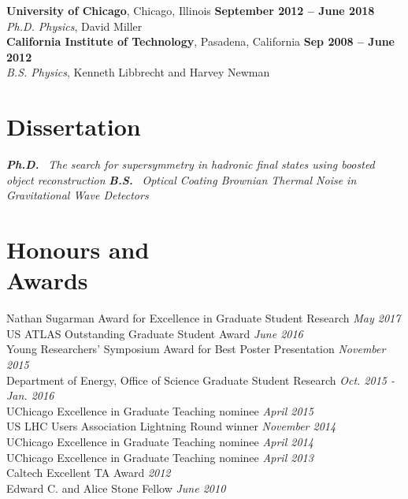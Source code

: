 \documentclass[margin,line]{resume}
\let\origsection\section%
\let\section\subsection%
\let\section\origsection%
\begin{document}
\begin{resume}
\textbf{University of Chicago}, Chicago, Illinois \hfill \textbf{September 2012 -- June 2018}\\
\textsl{Ph.D. Physics}, David Miller\\[2.5mm]
%
\textbf{California Institute of Technology}, Pasadena, California \hfill \textbf{ Sep 2008 -- June 2012}\\
\textsl{B.S. Physics}, Kenneth Libbrecht and Harvey Newman
%
%

\section{\mysidestyle Dissertation}

\textbf{\textsl{Ph.D.}} \href{https://kratsg.github.io/thesis/?utm_source=cv}{}~\textsl{The search for supersymmetry in hadronic final states using boosted object reconstruction}
\textbf{\textsl{B.S.}}\hspace{3mm} \href{https://www.dropbox.com/s/h0mpop96cn563bq/Thesis.pdf?dl=0}{}~\textsl{Optical Coating Brownian Thermal Noise in Gravitational Wave Detectors}

\section{\mysidestyle Honours and\\Awards}

Nathan Sugarman Award for Excellence in Graduate Student Research \hfill \textsl{May 2017}\\
US ATLAS Outstanding Graduate Student Award \hfill \textsl{June 2016}\\
Young Researchers' Symposium Award for Best Poster Presentation \hfill \textsl{November 2015}\\
Department of Energy, Office of Science Graduate Student Research \hfill \textsl{Oct. 2015 - Jan. 2016}\\
UChicago Excellence in Graduate Teaching nominee \hfill \textsl{April 2015}\\
US LHC Users Association Lightning Round winner \hfill \textsl{November 2014}\\
UChicago Excellence in Graduate Teaching nominee \hfill \textsl{April 2014}\\
UChicago Excellence in Graduate Teaching nominee \hfill \textsl{April 2013}\\
Caltech Excellent TA Award \hfill \textsl{2012}\\
Edward C. and Alice Stone Fellow \hfill \textsl{June 2010}


\end{resume}
\end{document}
